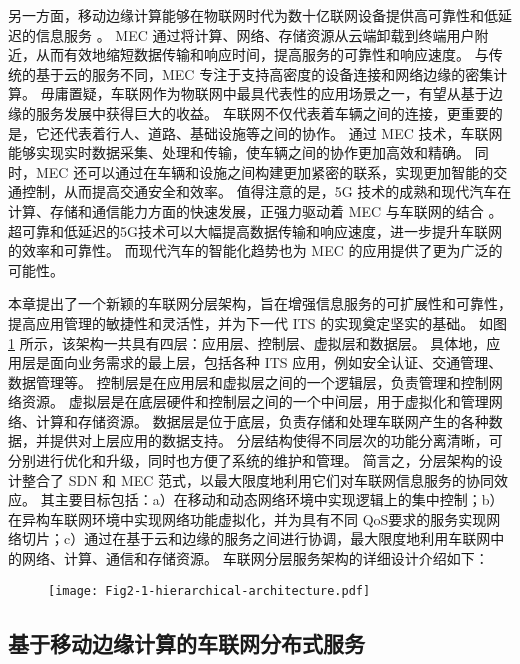 另一方面，移动边缘计算能够在物联网时代为数十亿联网设备提供高可靠性和低延迟的信息服务 \cite{shi2016edge}。
MEC 通过将计算、网络、存储资源从云端卸载到终端用户附近，从而有效地缩短数据传输和响应时间，提高服务的可靠性和响应速度。
与传统的基于云的服务不同，MEC 专注于支持高密度的设备连接和网络边缘的密集计算。
毋庸置疑，车联网作为物联网中最具代表性的应用场景之一，有望从基于边缘的服务发展中获得巨大的收益。
车联网不仅代表着车辆之间的连接，更重要的是，它还代表着行人、道路、基础设施等之间的协作。
通过 MEC 技术，车联网能够实现实时数据采集、处理和传输，使车辆之间的协作更加高效和精确。
同时，MEC 还可以通过在车辆和设施之间构建更加紧密的联系，实现更加智能的交通控制，从而提高交通安全和效率。
值得注意的是，5G 技术的成熟和现代汽车在计算、存储和通信能力方面的快速发展，正强力驱动着 MEC 与车联网的结合 \cite{li2021che}。
超可靠和低延迟的5G技术可以大幅提高数据传输和响应速度，进一步提升车联网的效率和可靠性。
而现代汽车的智能化趋势也为 MEC 的应用提供了更为广泛的可能性。

本章提出了一个新颖的车联网分层架构，旨在增强信息服务的可扩展性和可靠性，提高应用管理的敏捷性和灵活性，并为下一代 ITS 的实现奠定坚实的基础。
如图 \ref{fig 2-1} 所示，该架构一共具有四层：应用层、控制层、虚拟层和数据层。
具体地，应用层是面向业务需求的最上层，包括各种 ITS 应用，例如安全认证、交通管理、数据管理等。
控制层是在应用层和虚拟层之间的一个逻辑层，负责管理和控制网络资源。
虚拟层是在底层硬件和控制层之间的一个中间层，用于虚拟化和管理网络、计算和存储资源。
数据层是位于底层，负责存储和处理车联网产生的各种数据，并提供对上层应用的数据支持。
分层结构使得不同层次的功能分离清晰，可分别进行优化和升级，同时也方便了系统的维护和管理。
简言之，分层架构的设计整合了 SDN 和 MEC 范式，以最大限度地利用它们对车联网信息服务的协同效应。
其主要目标包括：a）在移动和动态网络环境中实现逻辑上的集中控制；b）在异构车联网环境中实现网络功能虚拟化，并为具有不同 QoS要求的服务实现网络切片；c）通过在基于云和边缘的服务之间进行协调，最大限度地利用车联网中的网络、计算、通信和存储资源。
车联网分层服务架构的详细设计介绍如下：

\begin{figure}[h] 
	\centering
	\texttt{[image: Fig2-1-hierarchical-architecture.pdf]}
	\label{fig 2-1}
\end{figure}

\subsection{基于移动边缘计算的车联网分布式服务}

